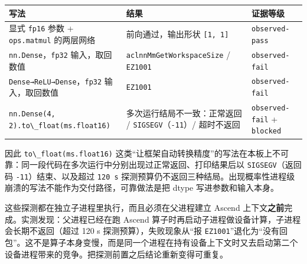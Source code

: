 \begin{longtable}[]{@{}
  >{\raggedright\arraybackslash}p{}
  >{\raggedright\arraybackslash}p{}
  >{\raggedright\arraybackslash}p{}@{}}
\toprule\noalign{}
\begin{minipage}[b]{\linewidth}\raggedright
写法
\end{minipage} & \begin{minipage}[b]{\linewidth}\raggedright
结果
\end{minipage} & \begin{minipage}[b]{\linewidth}\raggedright
证据等级
\end{minipage} \\
\midrule\noalign{}
\endhead
\bottomrule\noalign{}
\endlastfoot
显式 \passthrough{\lstinline!fp16!} 参数 +
\passthrough{\lstinline!ops.matmul!} 的两层网络 & 前向通过，输出形状
\passthrough{\lstinline![1, 1]!} &
\passthrough{\lstinline!observed-pass!} \\
\passthrough{\lstinline!nn.Dense!}，\passthrough{\lstinline!fp32!}
输入，取回数值 & \passthrough{\lstinline!aclnnMmGetWorkspaceSize!} /
\passthrough{\lstinline!EZ1001!} &
\passthrough{\lstinline!observed-fail!} \\
\passthrough{\lstinline!Dense→ReLU→Dense!}，\passthrough{\lstinline!fp32!}
输入，取回数值 & \passthrough{\lstinline!EZ1001!} &
\passthrough{\lstinline!observed-fail!} \\
\passthrough{\lstinline!nn.Dense(4, 2).to\_float(ms.float16)!} &
多次运行结局不一致：正常返回 /
\passthrough{\lstinline!SIGSEGV!}（\passthrough{\lstinline!-11!}）/
超时不返回 & \passthrough{\lstinline!observed-fail!} +
\passthrough{\lstinline!blocked!} \\
\end{longtable}

因此 \passthrough{\lstinline!to\_float(ms.float16)!}
这类``让框架自动转换精度''的写法在本板上不可靠：同一段代码在多次运行中分别出现过正常返回、打印结果后以
\passthrough{\lstinline!SIGSEGV!}（返回码
\passthrough{\lstinline!-11!}）结束、以及超过
\passthrough{\lstinline!120 s!}
探测预算仍不返回三种结局。出现概率性进程级崩溃的写法不能作为交付路径，可靠做法是把
dtype 写进参数和输入本身。

这些探测都在独立子进程里执行，而且必须在父进程建立 Ascend
上下文\textbf{之前}完成。实测发现：父进程已经在跑 Ascend
算子时再启动子进程做设备计算，子进程会长期不返回（超过 120 s
探测预算），失败现象从``报
\passthrough{\lstinline!EZ1001!}''退化为``没有回包''。这不是算子本身变慢，而是同一个进程在持有设备上下文时又去启动第二个设备进程带来的竞争。把探测前置之后结论重新变得可重复。

